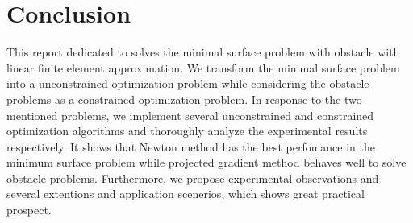 \section{Conclusion}
This report dedicated to solves the minimal surface problem with obstacle with linear finite element approximation. We transform the minimal surface problem into a unconstrained optimization problem while considering the obstacle problems as a constrained optimization problem. In response to the two mentioned problems, we implement several unconstrained and constrained optimization algorithms and thoroughly analyze the experimental results respectively. It shows that Newton method has the best perfomance in the minimum surface problem while projected gradient method behaves well to solve obstacle problems. Furthermore, we propose experimental observations and several extentions and application scenerios, which shows great practical prospect.